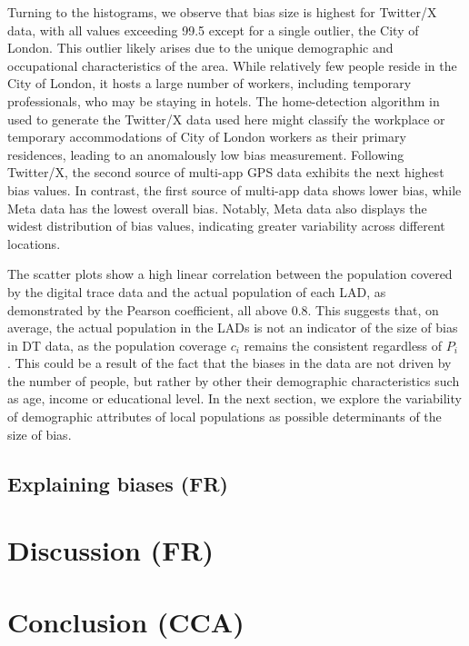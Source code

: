 \documentclass[]{rsos}%
\begin{document}
Turning to the histograms, we observe that bias size is highest for
Twitter/X data, with all values exceeding 99.5 except for a single
outlier, the City of London. This outlier likely arises due to the
unique demographic and occupational characteristics of the area. While
relatively few people reside in the City of London, it hosts a large
number of workers, including temporary professionals, who may be staying
in hotels. The home-detection algorithm in \citep{wang2022} used to generate
the Twitter/X data used here might classify the workplace or temporary
accommodations of City of London workers as their primary residences,
leading to an anomalously low bias measurement. Following Twitter/X, the
second source of multi-app GPS data exhibits the next highest bias
values. In contrast, the first source of multi-app data shows lower
bias, while Meta data has the lowest overall bias. Notably, Meta data
also displays the widest distribution of bias values, indicating greater
variability across different locations.

The scatter plots show a high linear correlation between the population
covered by the digital trace data and the actual population of each LAD,
as demonstrated by the Pearson coefficient, all above 0.8. This suggests
that, on average, the actual population in the LADs is not an indicator
of the size of bias in DT data, as the population coverage \(c_i\) remains
the consistent regardless of \(P_i\) . This could be a result of the fact
that the biases in the data are not driven by the number of people, but
rather by other their demographic characteristics such as age, income or
educational level. In the next section, we explore the variability of
demographic attributes of local populations as possible determinants of
the size of bias.

\subsection{Explaining biases (FR)}\label{explaining-biases-fr}

\section{Discussion (FR)}\label{discussion-fr}

\section{Conclusion (CCA)}\label{conclusion-cca}
\end{document}
